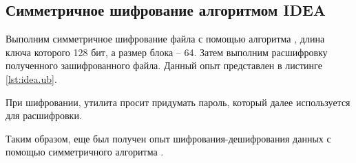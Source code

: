 \subsection{Симметричное шифрование алгоритмом IDEA}

Выполним симметричное шифрование файла с помощью алгоритма , длина ключа которого 128 бит, а размер блока -- 64. Затем выполним расшифровку полученного зашифрованного файла. Данный опыт представлен в листинге \ref{lst:idea.ub}.



При шифровании, утилита просит придумать пароль, который далее используется для расшифровки.

Таким образом, еще был получен опыт шифрования-дешифрования данных с помощью симметричного алгоритма .


